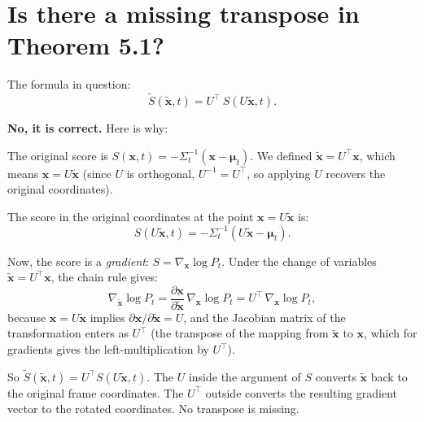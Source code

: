 \documentclass[11pt,a4paper]{article}
\begin{document}
\section{Is there a missing transpose in Theorem 5.1?}
\label{sec:q23}

The formula in question:
\begin{equation}
  \tilde{S}(\tilde{\mathbf{x}}, t) = U^\top\,S(U\tilde{\mathbf{x}}, t).
\end{equation}

\textbf{No, it is correct.}  Here is why:

The original score is $S(\mathbf{x}, t) = -\Sigma_t^{-1}(\mathbf{x} - \bm{\mu}_t)$.  We defined $\tilde{\mathbf{x}} = U^\top\mathbf{x}$, which means $\mathbf{x} = U\tilde{\mathbf{x}}$ (since $U$ is orthogonal, $U^{-1} = U^\top$, so applying $U$ recovers the original coordinates).

The score in the original coordinates at the point $\mathbf{x} = U\tilde{\mathbf{x}}$ is:
\begin{equation}
  S(U\tilde{\mathbf{x}}, t) = -\Sigma_t^{-1}(U\tilde{\mathbf{x}} - \bm{\mu}_t).
\end{equation}

Now, the score is a \emph{gradient}: $S = \nabla_{\mathbf{x}}\log P_t$.  Under the change of variables $\tilde{\mathbf{x}} = U^\top\mathbf{x}$, the chain rule gives:
\begin{equation}
  \nabla_{\tilde{\mathbf{x}}}\log P_t = \frac{\partial \mathbf{x}}{\partial \tilde{\mathbf{x}}}\,\nabla_{\mathbf{x}}\log P_t = U^\top\,\nabla_{\mathbf{x}}\log P_t,
\end{equation}
because $\mathbf{x} = U\tilde{\mathbf{x}}$ implies $\partial \mathbf{x}/\partial\tilde{\mathbf{x}} = U$, and the Jacobian matrix of the transformation enters as $U^\top$ (the transpose of the mapping from $\tilde{\mathbf{x}}$ to $\mathbf{x}$, which for gradients gives the left-multiplication by $U^\top$).

So $\tilde{S}(\tilde{\mathbf{x}}, t) = U^\top S(U\tilde{\mathbf{x}}, t)$.  The $U$ inside the argument of $S$ converts $\tilde{\mathbf{x}}$ back to the original frame coordinates.  The $U^\top$ outside converts the resulting gradient vector to the rotated coordinates.  No transpose is missing.


\end{document}
